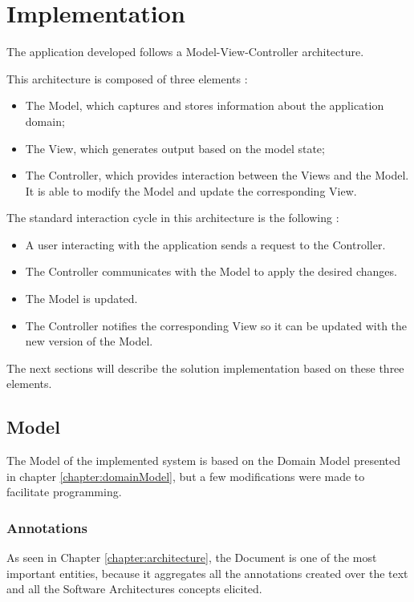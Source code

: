 
\chapter{Implementation}
\label{chapter:implementation}

The application developed follows a Model-View-Controller architecture.

This architecture is composed of three elements \cite{krasner1988description}:
\begin{itemize}
\item The Model, which captures and stores information about the application domain;
\item The View, which generates output based on the model state;
\item The Controller, which provides interaction between the Views and the Model. It is able to modify the Model and update the corresponding View.
\end{itemize}

The standard interaction cycle in this architecture is the following \cite{krasner1988description,reenskaug2009dci}:
\begin{itemize}
\item A user interacting with the application sends a request to the Controller.

\item The Controller communicates with the Model to apply the desired changes.

\item The Model is updated.

\item The Controller notifies the corresponding View so it can be updated with the new version of the Model.
\end{itemize}

The next sections will describe the solution implementation based on these three elements.


\section{Model}
\label{section:model}
The Model of the implemented system is based on the Domain Model presented in chapter \ref{chapter:domainModel}, but a few modifications were made to facilitate programming.

\subsection{Annotations}
\label{subsection:modelAnnotations}
As seen in Chapter \ref{chapter:architecture}, the Document is one of the most important entities, because it aggregates all the annotations created over the text and all the Software Architectures concepts elicited.

